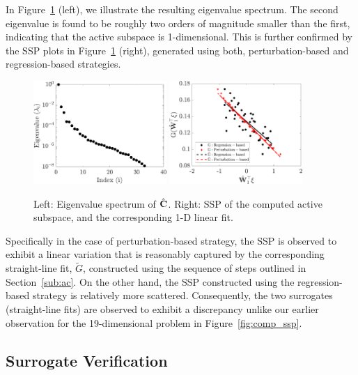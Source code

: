 In Figure~\ref{fig:hd} (left), we illustrate the resulting eigenvalue spectrum. The second eigenvalue is
found to be roughly two orders of magnitude smaller than the first, indicating that the active subspace
is 1-dimensional. This is further confirmed by the SSP plots in Figure~\ref{fig:hd} (right), generated
using both, perturbation-based and regression-based strategies. 
%
\begin{figure}[htbp]
 \begin{center}
   \includegraphics[width=0.45\textwidth]{./Figures/eig_33D}
   \includegraphics[width=0.45\textwidth]{./Figures/ssp_33D}
\caption{Left: Eigenvalue spectrum of $\hat{\mathbf{{C}}}$. Right: SSP of the computed active subspace, and the
corresponding 1-D linear fit.} 
\label{fig:hd}
\end{center}
\end{figure}
%
Specifically
in the case of perturbation-based strategy, the SSP is observed to exhibit a linear variation that
is reasonably
captured by the corresponding straight-line fit, $\tilde{G}$, constructed using the sequence of steps
outlined in Section~\ref{sub:ac}.
On the other hand, the SSP constructed using the regression-based strategy
is relatively more scattered. Consequently, the two surrogates (straight-line fits) are observed to exhibit a
discrepancy unlike our earlier observation for the 19-dimensional problem in Figure~\ref{fig:comp_ssp}. 

\subsection{Surrogate Verification}
\label{sub:verify}

